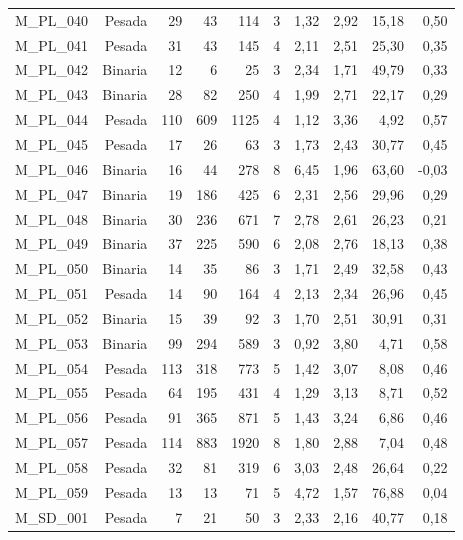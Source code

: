 \begin{table}[ht!]
\begin{tabular}{lrrrrrrrrr}
    M\_PL\_040 & Pesada & 29   & 43   & 114  & 3    & 1,32 & 2,92 & 15,18 & 0,50 \\
    M\_PL\_041 & Pesada & 31   & 43   & 145  & 4    & 2,11 & 2,51 & 25,30 & 0,35 \\
    M\_PL\_042 & Binaria & 12   & 6    & 25   & 3    & 2,34 & 1,71 & 49,79 & 0,33 \\
    M\_PL\_043 & Binaria & 28   & 82   & 250  & 4    & 1,99 & 2,71 & 22,17 & 0,29 \\
    M\_PL\_044 & Pesada & 110  & 609  & 1125 & 4    & 1,12 & 3,36 & 4,92 & 0,57 \\
    M\_PL\_045 & Pesada & 17   & 26   & 63   & 3    & 1,73 & 2,43 & 30,77 & 0,45 \\
    M\_PL\_046 & Binaria & 16   & 44   & 278  & 8    & 6,45 & 1,96 & 63,60 & -0,03 \\
    M\_PL\_047 & Binaria & 19   & 186  & 425  & 6    & 2,31 & 2,56 & 29,96 & 0,29 \\
    M\_PL\_048 & Binaria & 30   & 236  & 671  & 7    & 2,78 & 2,61 & 26,23 & 0,21 \\
    M\_PL\_049 & Binaria & 37   & 225  & 590  & 6    & 2,08 & 2,76 & 18,13 & 0,38 \\
    M\_PL\_050 & Binaria & 14   & 35   & 86   & 3    & 1,71 & 2,49 & 32,58 & 0,43 \\
    M\_PL\_051 & Pesada & 14   & 90   & 164  & 4    & 2,13 & 2,34 & 26,96 & 0,45 \\
    M\_PL\_052 & Binaria & 15   & 39   & 92   & 3    & 1,70 & 2,51 & 30,91 & 0,31 \\
    M\_PL\_053 & Binaria & 99   & 294  & 589  & 3    & 0,92 & 3,80 & 4,71 & 0,58 \\
    M\_PL\_054 & Pesada & 113  & 318  & 773  & 5    & 1,42 & 3,07 & 8,08 & 0,46 \\
    M\_PL\_055 & Pesada & 64   & 195  & 431  & 4    & 1,29 & 3,13 & 8,71 & 0,52 \\
    M\_PL\_056 & Pesada & 91   & 365  & 871  & 5    & 1,43 & 3,24 & 6,86 & 0,46 \\
    M\_PL\_057 & Pesada & 114  & 883  & 1920 & 8    & 1,80 & 2,88 & 7,04 & 0,48 \\
    M\_PL\_058 & Pesada & 32   & 81   & 319  & 6    & 3,03 & 2,48 & 26,64 & 0,22 \\
    M\_PL\_059 & Pesada & 13   & 13   & 71   & 5    & 4,72 & 1,57 & 76,88 & 0,04 \\
    M\_SD\_001 & Pesada & 7    & 21   & 50   & 3    & 2,33 & 2,16 & 40,77 & 0,18 \\

\end{tabular}
\end{table}
